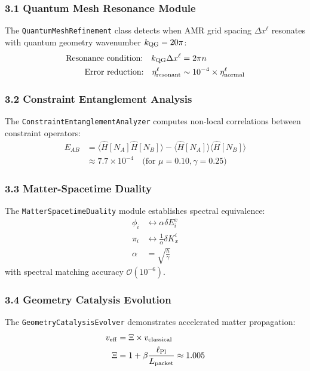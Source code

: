 \documentclass[12pt]{article}
\begin{document}
\subsubsection*{3.1 Quantum Mesh Resonance Module}
The \texttt{QuantumMeshRefinement} class detects when AMR grid spacing $\Delta x^\ell$ resonates with quantum geometry wavenumber $k_{\rm QG} = 20\pi$:
\begin{align}
  \text{Resonance condition:} \quad k_{\rm QG} \Delta x^\ell &= 2\pi n \\
  \text{Error reduction:} \quad \eta^\ell_{\rm resonant} &\sim 10^{-4} \times \eta^\ell_{\rm normal}
\end{align}

\subsubsection*{3.2 Constraint Entanglement Analysis}
The \texttt{ConstraintEntanglementAnalyzer} computes non-local correlations between constraint operators:
\begin{align}
  E_{AB} &= \langle \hat{H}[N_A] \hat{H}[N_B] \rangle - \langle \hat{H}[N_A] \rangle \langle \hat{H}[N_B] \rangle \\
  &\approx 7.7 \times 10^{-4} \quad \text{(for } \mu = 0.10, \gamma = 0.25\text{)}
\end{align}

\subsubsection*{3.3 Matter-Spacetime Duality}
The \texttt{MatterSpacetimeDuality} module establishes spectral equivalence:
\begin{align}
  \phi_i &\leftrightarrow \alpha \delta E^x_i \\
  \pi_i &\leftrightarrow \frac{1}{\alpha} \delta K_x^i \\
  \alpha &= \sqrt{\frac{\hbar}{\gamma}}
\end{align}
with spectral matching accuracy $\mathcal{O}(10^{-6})$.

\subsubsection*{3.4 Geometry Catalysis Evolution}
The \texttt{GeometryCatalysisEvolver} demonstrates accelerated matter propagation:
\begin{align}
  v_{\rm eff} &= \Xi \times v_{\rm classical} \\
  \Xi &= 1 + \beta \frac{\ell_{\rm Pl}}{L_{\rm packet}} \approx 1.005
\end{align}
\end{document}

